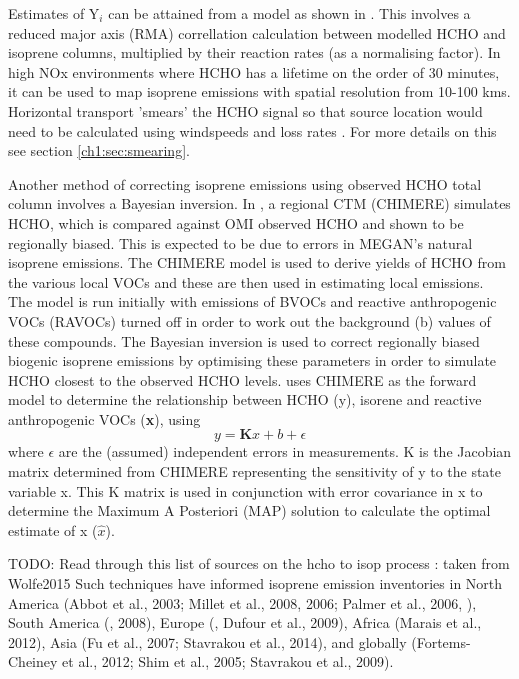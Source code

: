    
    Estimates of Y$_i$ can be attained from a model as shown in \citet{Millet2006}.
    This involves a reduced major axis (RMA) correllation calculation between modelled HCHO and isoprene columns, multiplied by their reaction rates (as a normalising factor).  
    In high NOx environments where HCHO has a lifetime on the order of 30 minutes, it can be used to map isoprene emissions with spatial resolution from 10-100 kms.
    Horizontal transport 'smears' the HCHO signal so that source location would need to be calculated using windspeeds and loss rates \citep{Palmer2001,Palmer2003}.
    For more details on this see section \ref{ch1:sec:smearing}.
    
    Another method of correcting isoprene emissions using observed HCHO total column involves a Bayesian inversion.
    In \citet{Curci2010}, a regional CTM (CHIMERE) simulates HCHO, which is compared against OMI observed HCHO and shown to be regionally biased.
    This is expected to be due to errors in MEGAN's natural isoprene emissions.
    The CHIMERE model is used to derive yields of HCHO from the various local VOCs and these are then used in estimating local emissions.
    The model is run initially with emissions of BVOCs and reactive anthropogenic VOCs (RAVOCs) turned off in order to work out the background (b) values of these compounds.
    The Bayesian inversion is used to correct regionally biased biogenic isoprene emissions by optimising these parameters in order to simulate HCHO closest to the observed HCHO levels.
    \cite{Curci2010} uses CHIMERE as the forward model to determine the relationship between HCHO (y), isorene and reactive anthropogenic VOCs (\textbf{x}), using 
    \begin{equation}
        y=\mathbf{K}x + b + \epsilon
    \end{equation}
    where $\epsilon$ are the (assumed) independent errors in measurements.
    K is the Jacobian matrix determined from CHIMERE representing the sensitivity of y to the state variable x.
    This K matrix is used in conjunction with error covariance in x to determine the Maximum A Posteriori (MAP) solution to calculate the optimal estimate of x ($\hat{x}$).
    
    TODO: Read through this list of sources on the hcho to isop process : taken from Wolfe2015
    Such techniques have informed isoprene emission inventories in North America (Abbot et al., 2003; Millet et al., 2008, 2006; Palmer et al., 2006, \citep{Palmer2003}), South America (\citep{Barkley2013}, 2008), Europe (\citep{Curci2010}, Dufour et al., 2009), Africa (Marais et al., 2012), Asia (Fu et al., 2007; Stavrakou et al., 2014), and globally (Fortems-Cheiney et al., 2012; Shim et al., 2005; Stavrakou et al., 2009).
    
